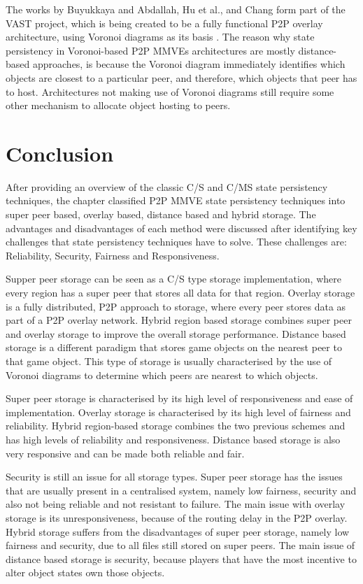 The works by Buyukkaya and Abdallah, Hu et al., and Chang form part of the VAST project, which is being created to be a fully functional P2P overlay architecture, using Voronoi diagrams as its basis \cite{VAST}. The reason why state persistency in Voronoi-based P2P MMVEs architectures are mostly distance-based approaches, is because the Voronoi diagram immediately identifies which objects are closest to a particular peer, and therefore, which objects that peer has to host. Architectures not making use of Voronoi diagrams still require some other mechanism to allocate object hosting to peers.

\section{Conclusion}

After providing an overview of the classic C/S and C/MS state persistency techniques, the chapter classified P2P MMVE state persistency techniques into super peer based, overlay based, distance based and hybrid storage. The advantages and disadvantages of each method were discussed after identifying key challenges that state persistency techniques have to solve. These challenges are: Reliability, Security, Fairness and Responsiveness.

Supper peer storage can be seen as a C/S type storage implementation, where every region has a super peer that stores all data for that region. Overlay storage is a fully distributed, P2P approach to storage, where every peer stores data as part of a P2P overlay network. Hybrid region based storage combines super peer and overlay storage to improve the overall storage performance. Distance based storage is a different paradigm that stores game objects on the nearest peer to that game object. This type of storage is usually characterised by the use of Voronoi diagrams to
determine which peers are nearest to which objects.

Super peer storage is characterised by its high level of responsiveness and ease of implementation. Overlay storage is characterised by its high level of fairness and reliability. Hybrid region-based storage combines the two previous schemes and has high levels of reliability and responsiveness. Distance based storage is also very responsive and can be made both reliable and fair.

Security is still an issue for all storage types. Super peer storage has the issues that are usually present in a centralised system, namely low fairness, security and also not being reliable and not resistant to failure. The main issue with overlay storage is its unresponsiveness, because of the routing delay in the P2P overlay. Hybrid storage suffers from the disadvantages of super peer storage, namely low fairness and security, due to all files still stored on super peers. The main issue of distance based storage is security, because players that have the most incentive to alter object states own those objects.

